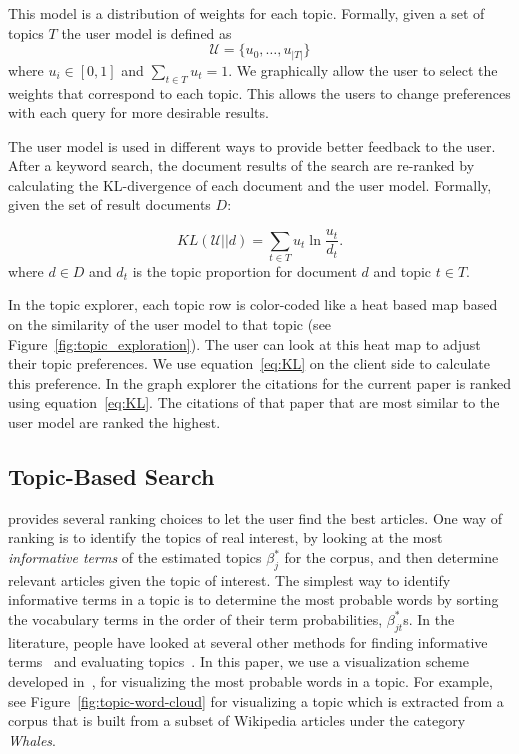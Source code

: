 This model is a distribution of weights for each topic.
Formally, given a set of topics $T$ the user model is defined as
$$
\mathcal{U} = \{u_0, \ldots, u_{|T|}\}
$$
where $u_i \in [0,1]$ and $\sum_{t \in T} u_t = 1$.
We graphically allow the user to select the weights that correspond to
each topic. This allows the users to change preferences with each query
for more desirable results.

The user model is used in different ways to provide better feedback to
the user. After a keyword search, the document results of the search 
are re-ranked by calculating the KL-divergence of each document and the
user model. Formally, given the set of result documents $D$:

\begin{equation} \label{eq:KL}
KL(\mathcal{U}||d) = \sum_{t \in T} u_t \ln \frac{u_t}{d_t}.
\end{equation}
where $d \in D$ and $d_t$ is the topic proportion for document $d$ and
topic $t \in T$. 

In the topic explorer, each topic row is color-coded like a heat 
based map based on the similarity of the user model to that topic (see Figure~\ref{fig:topic_exploration}).
The user can look at this heat map to adjust their topic preferences.
We use equation~\ref{eq:KL} on the client side to calculate this preference. 
In the graph explorer the citations for the current paper is ranked
using equation~\ref{eq:KL}. The citations of that paper that are most
similar to the user model are ranked the highest.


\subsection{Topic-Based Search}

\system provides several ranking choices to let the user find  
the best articles. One way of ranking is to identify the topics of 
real interest, by looking at the most \textsl{informative terms} of 
the estimated topics $\beta_j^{*}$ for the corpus, and then 
determine relevant articles given the topic of interest. The 
simplest way to identify informative terms in a topic is to 
determine the most probable words by sorting the vocabulary terms in 
the order of their term probabilities, $\beta_{jt}^{*}$s. In the 
literature, people have looked at several other methods for finding 
informative terms~\cite{2012-termite} and evaluating topics~\cite{mimno2011optimizing}. In this paper, we use a visualization scheme 
developed in~\cite{Davis2013}, for visualizing the most probable 
words in a topic. For example, see Figure~\ref{fig:topic-word-cloud} 
for visualizing a topic which is extracted from a corpus that is 
built from a subset of Wikipedia articles under the category 
\textsl{Whales}. 
       
